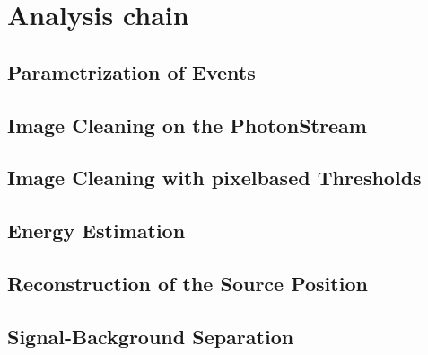 \chapter{Analysis chain}
%
\section{Parametrization of Events}
%
\section{Image Cleaning on the PhotonStream}
%
\section{Image Cleaning with pixelbased Thresholds}
%
\section{Energy Estimation}
%
\section{Reconstruction of the Source Position}
%
\section{Signal-Background Separation}
